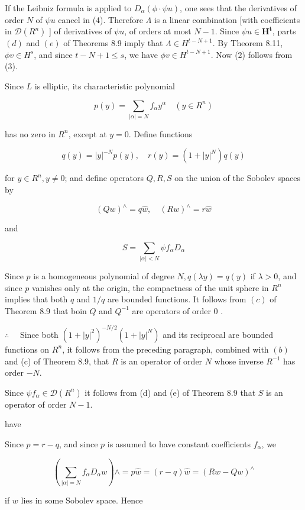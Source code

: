 \documentclass[10pt]{article}
\begin{document}
If the Leibniz formula is applied to $D_{\alpha}(\phi \cdot \psi u)$, one sees that the derivatives of order $N$ of $\psi u$ cancel in (4). Therefore $\Lambda$ is a linear combination [with coefficients in $\mathscr{D}\left(R^{n}\right)$ ] of derivatives of $\psi u$, of orders at most $N-1$. Since $\psi u \in \boldsymbol{H}^{\boldsymbol{t}}$, parts $(d)$ and $(e)$ of Theorems 8.9 imply that $\Lambda \in H^{t-N+1}$. By Theorem 8.11, $\phi v \in H^{s}$, and since $t-N+1 \leq s$, we have $\phi v \in H^{t-N+1}$. Now (2) follows from (3).

Since $L$ is elliptic, its characteristic polynomial

$$
p(y)=\sum_{|\alpha|=N} f_{\alpha} y^{\alpha} \quad\left(y \in R^{n}\right)
$$

has no zero in $R^{n}$, except at $y=0$. Define functions

$$
q(y)=|y|^{-N} p(y), \quad r(y)=\left(1+|y|^{N}\right) q(y)
$$

for $y \in R^{n}, y \neq 0$; and define operators $Q, R, S$ on the union of the Sobolev spaces by

$$
(Q w)^{\wedge}=q \hat{w}, \quad(R w)^{\wedge}=r \hat{w}
$$

and

$$
S=\sum_{|\alpha|<N} \psi f_{\alpha} D_{\alpha}
$$

Since $p$ is a homogeneous polynomial of degree $N, q(\lambda y)=q(y)$ if $\lambda>0$, and since $p$ vanishes only at the origin, the compactness of the unit sphere in $R^{n}$ implies that both $q$ and $1 / q$ are bounded functions. It follows from $(c)$ of Theorem 8.9 that boin $Q$ and $Q^{-1}$ are operators of order 0 .

$\therefore \quad$ Since both $\left(1+|y|^{2}\right)^{-N / 2}\left(1+|y|^{N}\right)$ and its reciprocal are bounded functions on $R^{n}$, it follows from the preceding paragraph, combined with $(b)$ and (c) of Theorem 8.9, that $R$ is an operator of order $N$ whose inverse $R^{-1}$ has order $-N$.

Since $\psi f_{\alpha} \in \mathscr{D}\left(R^{n}\right)$ it follows from (d) and (e) of Theorem 8.9 that $S$ is an operator of order $N-1$.

have

Since $p=r-q$, and since $p$ is assumed to have constant coefficients $f_{\alpha}$, we

$$
\left(\sum_{|\alpha|=N} f_{\alpha} D_{\alpha} w\right) \wedge=p \hat{w}=(r-q) \hat{w}=(R w-Q w)^{\wedge}
$$

if $w$ lies in some Sobolev space. Hence
\end{document}
